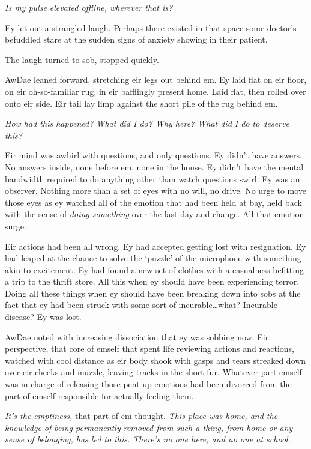 \emph{Is my pulse elevated offline, wherever that is?}

Ey let out a strangled laugh. Perhaps there existed in that space some doctor's befuddled stare at the sudden signs of anxiety showing in their patient.

The laugh turned to sob, stopped quickly.

AwDae leaned forward, stretching eir legs out behind em. Ey laid flat on eir floor, on eir oh-so-familiar rug, in eir bafflingly present home. Laid flat, then rolled over onto eir side. Eir tail lay limp against the short pile of the rug behind em.

\emph{How had this happened? What did I do? Why here? What did I do to deserve this?}

Eir mind was awhirl with questions, and only questions. Ey didn't have answers. No answers inside, none before em, none in the house. Ey didn't have the mental bandwidth required to do anything other than watch questions swirl. Ey was an observer. Nothing more than a set of eyes with no will, no drive. No urge to move those eyes as ey watched all of the emotion that had been held at bay, held back with the sense of \emph{doing something} over the last day and change. All that emotion surge.

Eir actions had been all wrong. Ey had accepted getting lost with resignation. Ey had leaped at the chance to solve the `puzzle' of the microphone with something akin to excitement. Ey had found a new set of clothes with a casualness befitting a trip to the thrift store. All this when ey should have been experiencing terror. Doing all these things when ey should have been breaking down into sobs at the fact that ey had been struck with some sort of incurable\ldots{}what? Incurable disease? Ey was lost.

AwDae noted with increasing dissociation that ey was sobbing now. Eir perspective, that core of emself that spent life reviewing actions and reactions, watched with cool distance as eir body shook with gasps and tears streaked down over eir cheeks and muzzle, leaving tracks in the short fur. Whatever part emself was in charge of releasing those pent up emotions had been divorced from the part of emself responsible for actually feeling them.

\emph{It's the emptiness,} that part of em thought. \emph{This place was home, and the knowledge of being permanently removed from such a thing, from home or any sense of belonging, has led to this. There's no one here, and no one at school.}

